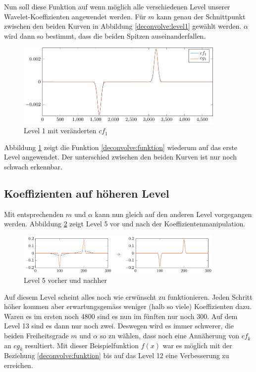 Nun soll diese Funktion auf wenn möglich alle verschiedenen Level unserer Wavelet-Koeffizienten angewendet werden.
Für $m$ kann genau der Schnittpunkt zwischen den beiden Kurven in Abbildung \ref{deconvolve:level1} gewählt werden.
$\alpha$ wird dann so bestimmt, dass die beiden Spitzen auseinanderfallen.
\begin{figure}[h]
\centering
\includegraphics[width=0.9\textwidth]{./papers/deconvolve/pictures/level/level1_n.pdf}
\caption{Level 1 mit veränderten $cf_1$\label{deconvolve:level1_n}}
\end{figure}

Abbildung \ref{deconvolve:level1_n} zeigt die Funktion \eqref{deconvolve:funktion} wiederum auf das erste Level angewendet.
Der unterschied zwischen den beiden Kurven ist nur noch schwach erkennbar.

\subsection{Koeffizienten auf höheren Level}

Mit entsprechenden $m$ und $\alpha$ kann nun gleich auf den anderen Level vorgegangen werden.
Abbildung \ref{deconvolve:level5} zeigt Level 5 vor und nach der Koeffizientenmanipulation.
\begin{figure}[h]
\centering
\includegraphics[width=0.9\textwidth]{./papers/deconvolve/pictures/level/level5.pdf}
\caption{Level 5 vorher und nachher\label{deconvolve:level5}}
\end{figure}

Auf diesem Level scheint alles noch wie erwünscht zu funktionieren.
Jeden Schritt höher kommen aber erwartungsgemäss weniger (halb so viele) Koeffizienten dazu.
Waren es im ersten noch 4800 sind es nun im fünften nur noch 300.
Auf dem Level 13 sind es dann nur noch zwei.
Deswegen wird es immer schwerer, die beiden Freiheitsgrade $m$ und $\alpha$ so zu wählen, dass noch eine Annäherung von $cf_k$ an $cg_k$ resultiert.
Mit dieser Beispielfunktion $f(x)$ war es möglich mit der Beziehung \eqref{deconvolve:funktion} bis auf das Level 12 eine Verbesserung zu erreichen.

